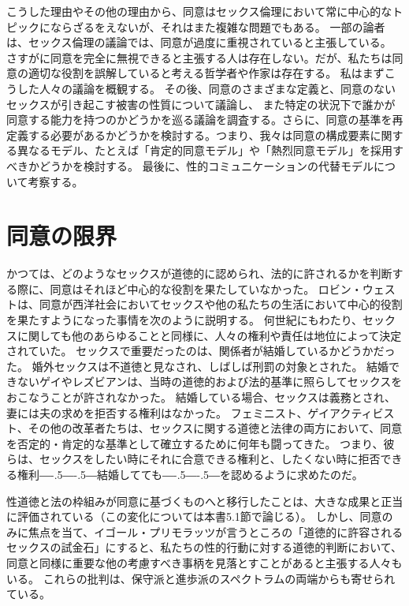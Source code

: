 \documentclass[paper=a4,book,openany]{jlreq}
\newcommand{\ig}[1]{}           %
\def\DDASH{―\kern-.5\zw―\kern-.5\zw―} %
\begin{document}
こうした理由やその他の理由から、同意はセックス倫理において常に中心的なトピックにならざるをえないが、それはまた複雑な問題でもある。
一部の論者は、セックス倫理の議論では、同意が過度に重視されていると主張している。
さすがに同意を完全に無視できると主張する人は存在しない。だが、私たちは同意の適切な役割を誤解していると考える哲学者や作家は存在する。
私はまずこうした人々の議論を概観する。
その後、同意のさまざまな定義と、同意のないセックスが引き起こす被害の性質について議論し、
また特定の状況下で誰かが同意する能力を持つのかどうかを巡る議論を調査する。さらに、同意の基準を再定義する必要があるかどうかを検討する。つまり、我々は同意の構成要素に関する異なるモデル、たとえば「肯定的同意モデル」や「熱烈同意モデル」を採用すべきかどうかを検討する。
最後に、性的コミュニケーションの代替モデルについて考察する。

\section{同意の限界}

かつては、どのようなセックスが道徳的に認められ、法的に許されるかを判断する際に、同意はそれほど中心的な役割を果たしていなかった。
ロビン・ウェスト\ig{Robin West}は、同意が西洋社会においてセックスや他の私たちの生活において中心的役割を果たすようになった事情を次のように説明する。
何世紀にもわたり、セックスに関しても他のあらゆることと同様に、人々の権利や責任は地位によって決定されていた。
セックスで重要だったのは、関係者が結婚しているかどうかだった。
婚外セックスは不道徳と見なされ、しばしば刑罰の対象とされた。
結婚できないゲイやレズビアンは、当時の道徳的および法的基準に照らしてセックスをおこなうことが許されなかった\citep[p.7]{west20:_consen_legit_dysph}。
結婚している場合、セックスは義務とされ、妻には夫の求めを拒否する権利はなかった。
フェミニスト、ゲイアクティビスト、その他の改革者たちは、セックスに関する道徳と法律の両方において、同意を否定的・肯定的な基準として確立するために何年も闘ってきた。
つまり、彼らは、セックスをしたい時にそれに合意できる権利と、したくない時に拒否できる権利{\DDASH}結婚してても{\DDASH}を認めるように求めたのだ。

性道徳と法の枠組みが同意に基づくものへと移行したことは、大きな成果と正当に評価されている（この変化については本書5.1節で論じる）。
しかし、同意のみに焦点を当て、イゴール・プリモラッツが言うところの「道徳的に許容されるセックスの試金石」\citep{primoratz01:_sexual_moral}にすると、私たちの性的行動に対する道徳的判断において、同意と同様に重要な他の考慮すべき事柄を見落とすことがあると主張する人々もいる。
これらの批判は、保守派と進歩派のスペクトラムの両端からも寄せられている。
\end{document}
